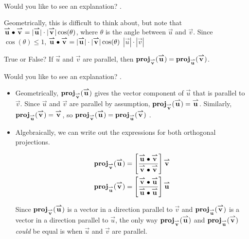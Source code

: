 \documentclass{ximera}
\begin{document}
\begin{exercise}
\begin{selectAll}
\begin{hint}
\begin{problem}
Would you like to see an explanation?
.

\begin{question}
\begin{itemize}
Geometrically, this is difficult to think about, but note that $\vec{u} \dotp \vec{v} =  |\vec{u}| \cdot |\vec{v}| \cos(\theta)$, where $\theta$ is the angle between $\vec{u}$ and $\vec{v}$.  Since $\cos(\theta) \leq 1$, $\vec{u} \dotp \vec{v} =  |\vec{u}| \cdot |\vec{v}| \cos(\theta)$ \wordChoice{\choice[correct]{$\leq$}\choice{$\geq$}} $|\vec{u}| \cdot |\vec{v}|$
\end{itemize}
\end{question}
\end{problem}
\begin{problem}
True or False?  If $\vec{u}$ and $\vec{v}$ are parallel, then $\proj_\vec{v}(\vec{u}) = \proj_\vec{u}(\vec{v})$.

Would you like to see an explanation?
.

\begin{question}
\begin{itemize}
\item Geometrically, $\proj_\vec{v}(\vec{u})$ gives the vector component of $\vec{u}$ that is parallel to $\vec{v}$.  Since $\vec{u}$ and $\vec{v}$ are parallel by assumption, $\proj_\vec{v}(\vec{u}) =\vec{u}$.  Similarly, $\proj_\vec{u}(\vec{v}) =\vec{v}$, so $\proj_\vec{v}(\vec{u}) = \proj_\vec{u}(\vec{v})$ .

\item Algebraically, we can write out the expressions for both orthogonal projections.

\begin{align*}
\proj_\vec{v}(\vec{u}) &= \left[\frac{\vec{u} \dotp \vec{v}}{\vec{v} \dotp \vec{v}}\right] \vec{v} \\
\proj_\vec{u}(\vec{v}) &= \left[\frac{\vec{v} \dotp \vec{u}}{\vec{u} \dotp \vec{u}}\right] \vec{u} \\
\end{align*}

Since $\proj_\vec{v}(\vec{u})$ is a vector in a direction parallel to $\vec{v}$ and $\proj_\vec{u}(\vec{v})$ is a vector in a direction parallel to $\vec{u}$, the only way  $\proj_\vec{v}(\vec{u})$ and $\proj_\vec{u}(\vec{v})$ \emph{could} be equal is when $\vec{u}$ and $\vec{v}$ are parallel.


\end{itemize}
\end{question}
\end{problem}
\end{hint}
\end{selectAll}
\end{exercise}
\end{document}

